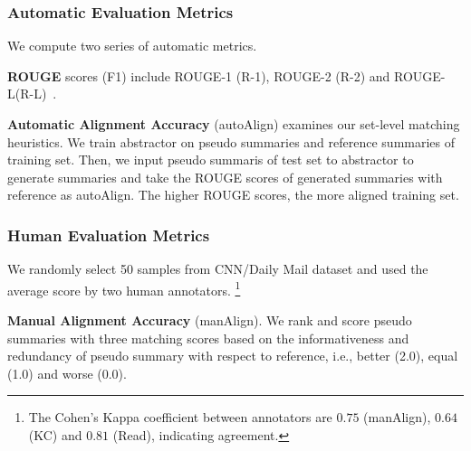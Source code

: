 \subsubsection{Automatic Evaluation Metrics}
We compute two series of automatic metrics.

\textbf{ROUGE} scores (F1) include
ROUGE-1 (R-1), ROUGE-2 (R-2) and
ROUGE-L(R-L)~\cite{rouge}.

\textbf{Automatic Alignment Accuracy} (autoAlign)
examines our set-level matching heuristics.
We train abstractor on pseudo summaries 
and reference summaries of training set.
Then, we input pseudo summaris of test set to abstractor
to generate summaries and take the ROUGE scores of generated summaries with reference
as autoAlign.
The higher ROUGE scores, the more aligned training set.


\subsubsection{Human Evaluation Metrics}
We randomly select 50 samples
from CNN/Daily Mail dataset
and used the average score by two human annotators.
\footnote{
The Cohen's Kappa coefficient between annotators 
are $0.75$ (manAlign),
$0.64$ (KC)
and $0.81$ (Read), indicating agreement. 
}

\textbf{Manual Alignment Accuracy} (manAlign).
We rank and score pseudo summaries with three matching scores
based on the informativeness and redundancy of pseudo summary with respect to reference,
i.e., better (2.0), equal (1.0) and worse (0.0). 

